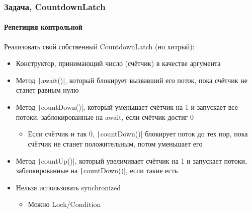 \documentclass[xetex,mathserif,serif]{beamer}
\begin{document}
	\begin{frame}
		\frametitle{Задача, CountdownLatch}
		\framesubtitle{Репетиция контрольной}
		Реализовать свой собственный CountdownLatch (но хитрый):
		\begin{itemize}
			\item Конструктор, принимающий число (счётчик) в качестве аргумента
			\item Метод \texttt|await()|, который блокирует вызвавший его поток, пока счётчик не станет равным нулю
			\item Метод \texttt|countDown()|, который уменьшает счётчик на 1 и запускает все потоки, заблокированные на await, если счётчик достиг 0
			\begin{itemize}
				\item Если счётчик и так 0, \texttt|countDown()| блокирует поток до тех пор, пока счётчик не станет положительным, потом уменьшает его
			\end{itemize}
			\item Метод \texttt|countUp()|, который увеличивает счётчик на 1 и запускает потоки, заблокированные на \texttt|countDown()|, если такие есть
			\item Нельзя использовать synchronized
			\begin{itemize}
				\item Можно Lock/Condition
			\end{itemize}
		\end{itemize}
	\end{frame}
\end{document}

